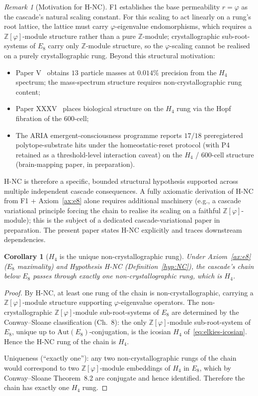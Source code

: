 \documentclass[12pt]{article}
\newtheorem{corollary}[theorem]{Corollary}
\theoremstyle{definition}
\theoremstyle{remark}
\newtheorem{remark}[theorem]{Remark}
\newcommand{\Zphi}{\mathbb{Z}[\varphi]}
\begin{document}
\begin{remark}[Motivation for H-NC]\label{rem:HNC-motivation}
F1 establishes the base permeability $r = \varphi$ as the cascade's natural scaling constant. For this scaling to act linearly on a rung's root lattice, the lattice must carry $\varphi$-eigenvalue endomorphisms, which requires a $\Zphi$-module structure rather than a pure $\mathbb{Z}$-module; crystallographic sub-root-systems of $E_8$ carry only $\mathbb{Z}$-module structure, so the $\varphi$-scaling cannot be realised on a purely crystallographic rung. Beyond this structural motivation:
\begin{itemize}
\item Paper V~\citep{SmartV} obtains $13$ particle masses at $0.014\%$ precision from the $H_4$ spectrum; the mass-spectrum structure requires non-crystallographic rung content;
\item Paper XXXV~\citep{SmartXXXV} places biological structure on the $H_4$ rung via the Hopf fibration of the 600-cell;
\item The ARIA emergent-consciousness programme reports $17/18$ preregistered polytope-substrate hits under the homeostatic-reset protocol (with P4 retained as a threshold-level interaction caveat) on the $H_4$ / 600-cell structure (brain-mapping paper, in preparation).
\end{itemize}
H-NC is therefore a specific, bounded structural hypothesis supported across multiple independent cascade consequences. A fully axiomatic derivation of H-NC from F1 + Axiom~\ref{ax:e8} alone requires additional machinery (e.g., a cascade variational principle forcing the chain to realise its scaling on a faithful $\Zphi$-module); this is the subject of a dedicated cascade-variational paper in preparation. The present paper states H-NC explicitly and traces downstream dependencies.
\end{remark}

\begin{corollary}[$H_4$ is the unique non-crystallographic rung]\label{cor:h4-unique}
Under Axiom~\ref{ax:e8} ($E_8$ maximality) and Hypothesis H-NC (Definition~\ref{hyp:NC}), the cascade's chain below $E_8$ passes through exactly one non-crystallographic rung, which is $H_4$.
\end{corollary}

\begin{proof}
By H-NC, at least one rung of the chain is non-crystallographic, carrying a $\Zphi$-module structure supporting $\varphi$-eigenvalue operators. The non-crystallographic $\Zphi$-module sub-root-systems of $E_8$ are determined by the Conway--Sloane classification (Ch.~8): the only $\Zphi$-module sub-root-system of $E_8$, unique up to $\mathrm{Aut}(E_8)$-conjugation, is the icosian $H_4$ of~\eqref{eq:elkies-icosian}. Hence the H-NC rung of the chain is $H_4$.

Uniqueness (``exactly one''): any two non-crystallographic rungs of the chain would correspond to two $\Zphi$-module embeddings of $H_4$ in $E_8$, which by Conway--Sloane Theorem~8.2 are conjugate and hence identified. Therefore the chain has exactly one $H_4$ rung.
\end{proof}
\end{document}

